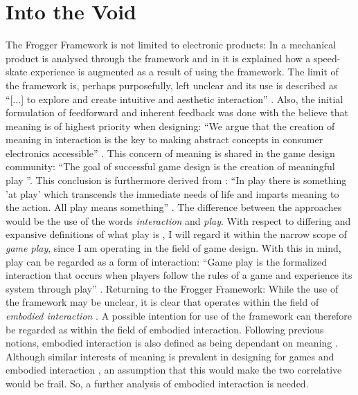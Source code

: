 \section{Into the Void}
The Frogger Framework is not limited to electronic products: In  a mechanical product is analysed through the framework and in  it is explained how a speed-skate experience is augmented as a result of using the framework. The limit of the framework is, perhaps purposefully, left unclear and its use is described as ``[...] to explore and create intuitive and aesthetic interaction'' \cite[p. 22]{transbehav}. Also, the initial formulation of feedforward and inherent feedback was done with the believe that meaning is of highest priority when designing: ``We argue that the creation of meaning in interaction is the key to making abstract concepts in consumer electronics accessible'' \cite[p. 2]{howdonald}. This concern of meaning is shared in the game design community: ``The goal of successful game design is the creation of meaningful play ''\cite[ch. 3, p. 3]{salen}. This conclusion is furthermore derived from \cite{huizinga}: ``In play there is something 'at play' which transcends the immediate needs of life and imparts meaning to the action. All play means something'' \cite[p. 1]{huizinga}. The difference between the approaches would be the use of the words \textit{interaction} and \textit{play}. With respect to differing and expansive definitions of what play is \cite{huizinga, sicartplay, salen}, I will regard it within the narrow scope of \textit{game play}, since I am operating in the field of game design. With this in mind, play can be regarded as a form of interaction: ``Game play is the formalized interaction that occurs when players follow the rules of a game and experience its system through play'' \cite[ch. 22, p. 3]{salen}.
Returning to the Frogger Framework: While the use of the framework may be unclear, it is clear that  operates within the field of \textit{embodied interaction} \cite{transbehav}. A possible intention for use of the framework can therefore be regarded as within the field of embodied interaction. Following previous notions, embodied interaction is also defined as being dependant on meaning \cite[p. 126]{dourish}. Although similar interests of meaning is prevalent in designing for games \cite{salen} and embodied interaction \cite{dourish}, an assumption that this would make the two correlative would be frail. So, a further analysis of embodied interaction is needed.

